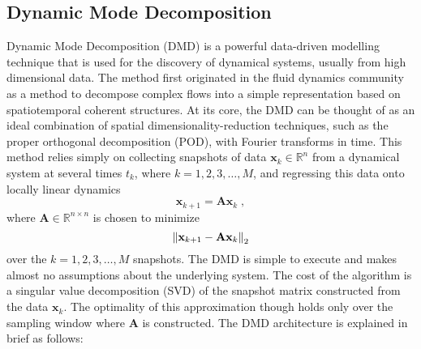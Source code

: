 \subsection{Dynamic Mode Decomposition}
\label{sec:DMD}
Dynamic Mode Decomposition (DMD) is a powerful data-driven modelling technique that is used for the discovery of dynamical systems, usually from high dimensional data. The method first originated in the fluid dynamics community as a method to decompose complex flows into a simple representation based on spatiotemporal coherent structures. At its core, the DMD can be thought of as an ideal combination of spatial dimensionality-reduction techniques, such as the proper orthogonal decomposition (POD), with Fourier transforms in time. This method relies simply on collecting snapshots of data $\mathbf{x}_k \in \mathbb{R}^n$ from a dynamical system at several times $t_k$, where $k = 1,2,3,\dots,M$, and regressing this data onto locally linear dynamics 
% 
\begin{equation}
\label{eq:DMD1}
    \mathbf{x}_{k+1} = \mathbf{Ax}_k \;,
\end{equation}
% 
where $\mathbf{A} \in \mathbb{R}^{n\times n}$ is chosen to minimize
% 
\begin{equation}
\label{eq:norm_error}
    \left\lVert\mathbf{x}_{k+1} - \mathbf{Ax}_k\right\rVert_2
\end{equation}
% 
over the $k = 1,2,3,\dots,M$ snapshots. The DMD is simple to execute and makes almost no assumptions about the underlying system. The cost of the algorithm is a singular value decomposition (SVD) of the snapshot matrix constructed from the data $\mathbf{x}_k$. The optimality of this approximation though holds only over the sampling window where $\mathbf{A}$ is constructed. The DMD architecture is explained in brief as follows:
